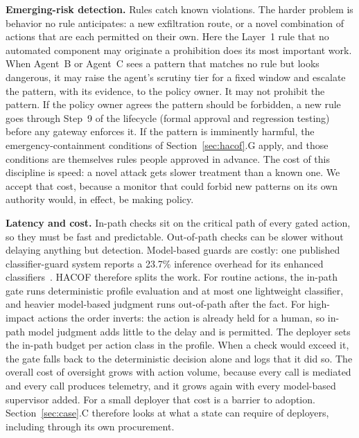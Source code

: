 \documentclass[journal]{IEEEtran}
\newcommand{\hacof}{HACOF}
\begin{document}
\textbf{Emerging-risk detection.} Rules catch known violations. The harder problem is behavior no rule anticipates: a new exfiltration route, or a novel combination of actions that are each permitted on their own. Here the Layer~1 rule that no automated component may originate a prohibition does its most important work. When Agent~B or Agent~C sees a pattern that matches no rule but looks dangerous, it may raise the agent's scrutiny tier for a fixed window and escalate the pattern, with its evidence, to the policy owner. It may not prohibit the pattern. If the policy owner agrees the pattern should be forbidden, a new rule goes through Step~9 of the lifecycle (formal approval and regression testing) before any gateway enforces it. If the pattern is imminently harmful, the emergency-containment conditions of Section~\ref{sec:hacof}.G apply, and those conditions are themselves rules people approved in advance. The cost of this discipline is speed: a novel attack gets slower treatment than a known one. We accept that cost, because a monitor that could forbid new patterns on its own authority would, in effect, be making policy.

\textbf{Latency and cost.} In-path checks sit on the critical path of every gated action, so they must be fast and predictable. Out-of-path checks can be slower without delaying anything but detection. Model-based guards are costly: one published classifier-guard system reports a 23.7\% inference overhead for its enhanced classifiers~\cite{sharma2025constitutionalclassifiers}.
\hacof{} therefore splits the work. For routine actions, the in-path gate runs deterministic profile evaluation and at most one lightweight classifier, and heavier model-based judgment runs out-of-path after the fact. For high-impact actions the order inverts: the action is already held for a human, so in-path model judgment adds little to the delay and is permitted. The deployer sets the in-path budget per action class in the profile. When a check would exceed it, the gate falls back to the deterministic decision alone and logs that it did so. The overall cost of oversight grows with action volume, because every call is mediated and every call produces telemetry, and it grows again with every model-based supervisor added. For a small deployer that cost is a barrier to adoption. Section~\ref{sec:case}.C therefore looks at what a state can require of deployers, including through its own procurement.
\end{document}
